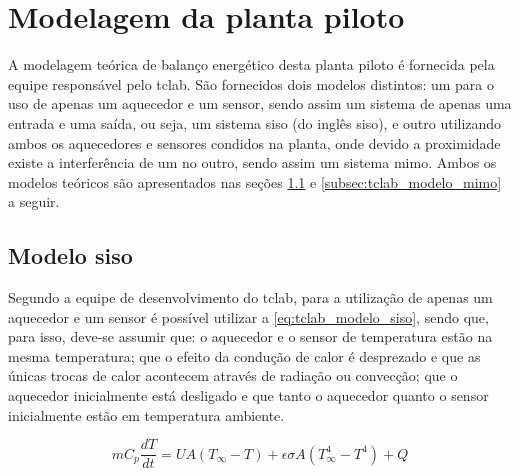 \section{Modelagem da planta piloto}
\label{sec:modelagem_da_planta_piloto}

A modelagem teórica de balanço energético desta planta piloto é fornecida pela equipe responsável
pelo \acrshort{tclab}. São fornecidos dois modelos distintos: um para o uso de apenas um aquecedor e
um sensor, sendo assim um sistema de apenas uma entrada e uma saída, ou seja, um sistema \acrshort{siso}
(do inglês \acrlong{siso}), e outro utilizando ambos os aquecedores e sensores condidos na planta,
onde devido a proximidade existe a interferência de um no outro, sendo assim um sistema \acrshort{mimo}.
Ambos os modelos teóricos são apresentados nas seções \ref{subsec:tclab_modelo_siso} e
\ref{subsec:tclab_modelo_mimo} a seguir.

\subsection{Modelo \acrshort{siso}}
\label{subsec:tclab_modelo_siso}

Segundo a equipe de desenvolvimento do \acrshort{tclab}, para a utilização de apenas um aquecedor e
um sensor é possível utilizar a \cref{eq:tclab_modelo_siso}, sendo que, para isso, deve-se assumir
que: o aquecedor e o sensor de temperatura estão na mesma temperatura; que o efeito da condução de calor
é desprezado e que as únicas trocas de calor acontecem através de radiação ou convecção; que o
aquecedor inicialmente está desligado e que tanto o aquecedor quanto o sensor inicialmente estão
em temperatura ambiente.

\begin{equation}
	\label{eq:tclab_modelo_siso}
	mC_p \dfrac{dT}{dt} = UA (T_{\infty} - T) + \epsilon \sigma A (T_{\infty}^{4} - T^{4}) + Q
\end{equation}

